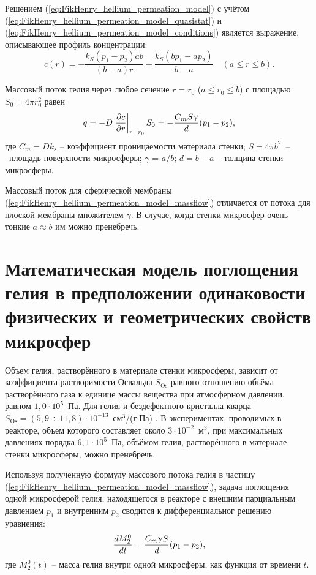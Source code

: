 Решением (\ref{eq:FikHenry_hellium_permeation_model}) с учётом (\ref{eq:FikHenry_hellium_permeation_model_quasistat}) и (\ref{eq:FikHenry_hellium_permeation_model_conditions}) является выражение, описывающее профиль концентрации:
\begin{equation}
\label{eq:eq:FikHenry_hellium_permeation_model_solution}
c(r) = -\frac{k_S(p_1-p_2)ab}{(b-a)r}+\frac{k_S(bp_1-ap_2)}{b-a}\quad
(a \leq r \leq b).
\end{equation}

Массовый поток гелия через любое сечение $r=r_0$ ($a\leq r_0 \leq b$) с площадью $S_0=4\pi r_0^2$ равен
\begin{equation}
\label{eq:FikHenry_hellium_permeation_model_massflow}
q = -D \left. \frac{\partial c}{\partial r} \right|_{r=r_0}S_0=-\frac{C_m S \upgamma}{d}(p_1-p_2),
\end{equation}
где $C_m = D k_s$ -- коэффициент проницаемости материала стенки; $S=4 \pi b^2$~--~площадь поверхности микросферы; $\gamma$ = $a/b$; $d=b-a$ -- толщина стенки микросферы.

Массовый поток для сферической мембраны (\ref{eq:FikHenry_hellium_permeation_model_massflow}) отличается от потока для плоской мембраны \cite{Hvang, Ditnerskiy, Mulder} множителем $\gamma$. В случае, когда стенки микросфер очень тонкие $a \approx b$ им можно пренебречь.

\section{Математическая модель поглощения гелия в предположении одинаковости физических и геометрических свойств микросфер}
 \label{section_2_2}

Объем гелия, растворённого в материале стенки микросферы, зависит от коэффициента растворимости Освальда $S_{\mathrm{Os}}$ равного отношению объёма растворённого газа к единице массы вещества при атмосферном давлении, равном $1,0 \cdot 10^5$~Па. Для гелия и бездефектного кристалла кварца $S_{\mathrm{Os}}=(5,9 \div 11,8) \cdot 10^{-13}$~см$^3$/(г$\cdot$Па) \cite{Argunova_Sorokin}. В экспериментах, проводимых в реакторе, объем которого составляет около $3\cdot 10^{-2}$~м$^3$, при максимальных давлениях порядка $6,1\cdot 10^5$~Па, объёмом гелия, растворённого в материале стенки микросферы, можно пренебречь.

Используя полученную формулу массового потока гелия в частицу  (\ref{eq:FikHenry_hellium_permeation_model_massflow}), задача поглощения одной микросферой гелия, находящегося в реакторе с внешним парциальным давлением $p_1$ и внутренним $p_2$ сводится к дифференциальног решению уравнения:
\begin{equation}
\label{eq:one_particle_permiation}
\frac{dM^0_2}{dt}= \frac{C_m\upgamma S}{d}(p_1-p_2),
\end{equation}
где $M^0_2(t)$ -- масса гелия внутри одной микросферы, как функция от времени $t$. 

